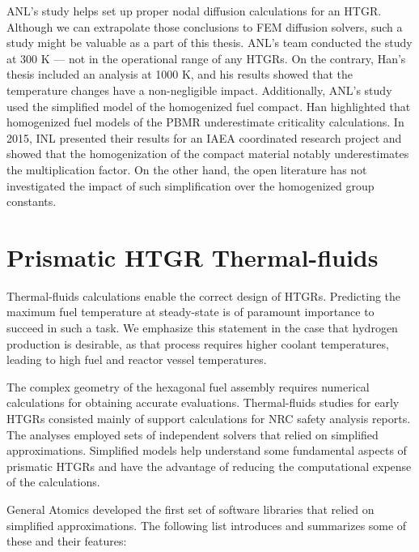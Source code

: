 ANL's study helps set up proper nodal diffusion calculations for an \gls{HTGR}.
Although we can extrapolate those conclusions to \gls{FEM} diffusion solvers, such a study might be valuable as a part of this thesis.
ANL's team conducted the study at 300 K --- not in the operational range of any \glspl{HTGR}.
On the contrary, Han's thesis included an analysis at 1000 K, and his results showed that the temperature changes have a non-negligible impact.
Additionally, ANL's study used the simplified model of the homogenized fuel compact.
Han highlighted that homogenized fuel models of the \gls{PBMR} underestimate criticality calculations.
In 2015, \gls{INL} presented their results \cite{strydom_results_2015} for an \gls{IAEA} coordinated research project \cite{tyobeka_htgr_2011} and showed that the homogenization of the compact material notably underestimates the multiplication factor.
On the other hand, the open literature has not investigated the impact of such simplification over the homogenized group constants.

\section{Prismatic HTGR Thermal-fluids}
\label{sec:litrev-thermalf}

Thermal-fluids calculations enable the correct design of \glspl{HTGR}.
Predicting the maximum fuel temperature at steady-state is of paramount importance to succeed in such a task.
We emphasize this statement in the case that hydrogen production is desirable, as that process requires higher coolant temperatures, leading to high fuel and reactor vessel temperatures.

The complex geometry of the hexagonal fuel assembly requires numerical calculations for obtaining accurate evaluations.
Thermal-fluids studies for early \glspl{HTGR} consisted mainly of support calculations for \gls{NRC} safety analysis reports.
The analyses employed sets of independent solvers that relied on simplified approximations.
Simplified models help understand some fundamental aspects of prismatic \glspl{HTGR} and have the advantage of reducing the computational expense of the calculations.

General Atomics \cite{shenoy_htgr_1974} developed the first set of software libraries that relied on simplified approximations.
The following list introduces and summarizes some of these and their features:

